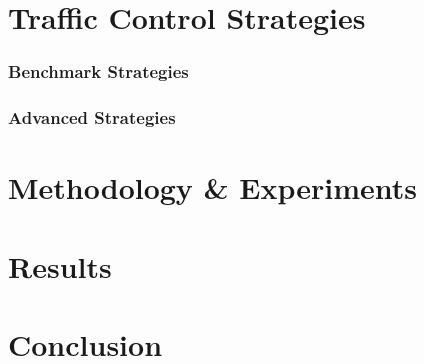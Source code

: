 \documentclass[10pt]{article}
\begin{document}
\section{Traffic Control Strategies}
\label{sec:strategies}

\subsubsection{Benchmark Strategies}

\subsubsection{Advanced Strategies}

\section{Methodology \& Experiments}
\label{sec:experiments}

\section{Results}
\label{sec:results}
	
\section{Conclusion}
\label{sec:conclusion}

{\tiny\printbibliography}
\end{document}
